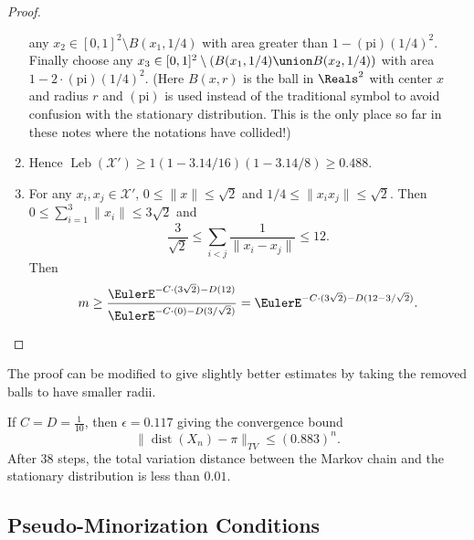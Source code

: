 \documentclass[12pt]{article}
\begin{document}
\begin{proof}
\begin{enumerate}
            any \( x_2 \in [0,1]^2 \setminus B(x_1, 1/4) \) with area
            greater than \( 1 - (\text{pi})(1/4)^2 \).  Finally choose
            any \( x_3 \in [0,1]^2 \setminus (B(x_1, 1/4) \union B(x_2,
            1/4)) \) with area \( 1 - 2 \cdot (\text{pi})(1/4)^2 \).  (Here
            \( B(x,r) \) is the ball in \( \Reals^2 \) with center \( x \)
            and radius \( r \) and \( (\text{pi}) \) is used instead of
            the traditional symbol to avoid confusion with the
            stationary distribution.  This is the only place so far in
            these notes where the notations have collided!)
        \item
            Hence \(
            \operatorname{Leb}
            (\mathcal{X}') \ge 1 (1 - 3.14/16)(1 - 3.14/8) \ge 0.488 \).
        \item
            For any \( x_{i}, x_j \in \mathcal{X}' \), \( 0 \le \|x\|
            \le \sqrt{2} \) and \( 1/4 \le \| x_i x_j\| \le \sqrt{2} \).
            Then \( 0 \le \sum\limits_{i=1}^3 \|x_i\|\le 3 \sqrt{2} \)
            and
            \[
                \frac{3}{\sqrt{2}} \le \sum\limits_{i<j} \frac{1}{\| x_i
                - x_j \|} \le 12.
            \] Then
            \[
                m \ge \frac{\EulerE^{-C \cdot (3 \sqrt{2}) - D(12)}}{\EulerE^
                {-C \cdot (0) - D(3/\sqrt{2})}} = \EulerE^{-C \cdot (3
                \sqrt{2}) - D(12- 3/\sqrt{2})}.
            \]
    \end{enumerate}
\end{proof}

\begin{remark}
    The proof can be modified to give slightly better estimates by
    taking the removed balls to have smaller radii.
\end{remark}

If \( C = D = \frac{1}{10} \), then \( \epsilon = 0.117 \) giving the
convergence bound
\[
    \|
    \operatorname{dist}
    (X_n) - \pi \|_{TV} \le (0.883)^n.
\] After \( 38 \) steps, the total variation distance between the Markov
chain and the stationary distribution is less than \( 0.01 \).

\subsection*{Pseudo-Minorization Conditions}
\end{document}
